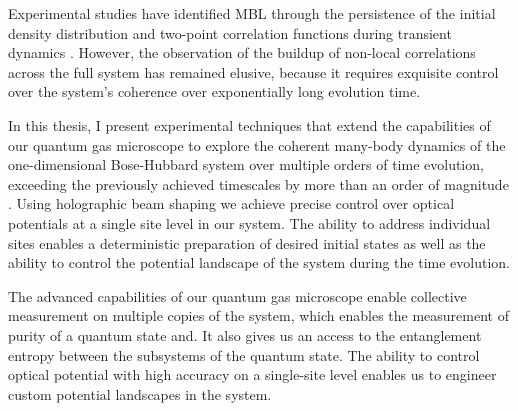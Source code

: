 Experimental studies have identified MBL through the persistence of the initial density distribution \cite{Schreiber2015, Smith2015, Bordia2016, Choi2016, Lueschen2017, Bordia2017} and two-point correlation functions during transient dynamics \cite{Smith2015}. However, the observation of the buildup of non-local correlations across the full system has remained elusive, because it requires exquisite control over the system's coherence over exponentially long evolution time.

In this thesis, I present experimental techniques that extend the capabilities of our quantum gas microscope \cite{Bakr2009} to explore the coherent many-body dynamics of the one-dimensional Bose-Hubbard system over multiple orders of time evolution, exceeding the previously achieved timescales by more than an order of magnitude \cite{Smith2015}. Using holographic beam shaping we achieve precise control over optical potentials at a single site level in our system. The ability to address individual sites enables a deterministic preparation of desired initial states as well as the ability to control the potential landscape of the system during the time evolution.

The advanced capabilities of our quantum gas microscope enable collective measurement on multiple copies of the system, which enables the measurement of purity of a quantum state and. It also gives us an access to the entanglement entropy between the subsystems of the quantum state. The ability to control optical potential with high accuracy on a single-site level enables us to engineer custom potential landscapes in the system.


